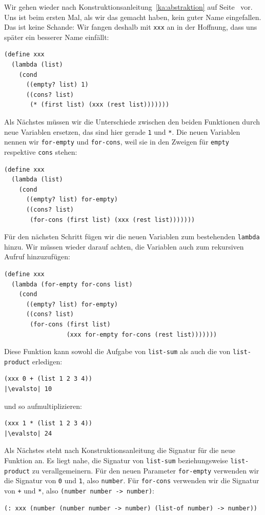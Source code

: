Wir gehen wieder nach Konstruktionsanleitung~\ref{ka:abstraktion} auf
Seite~\pageref{ka:abstraktion} vor.  Uns ist beim ersten Mal, als wir
das gemacht haben, kein guter Name eingefallen.  Das ist keine
Schande: Wir fangen deshalb mit \lstinline{xxx} an in der Hoffnung,
dass uns später ein besserer Name einfällt:
%
\begin{lstlisting}
(define xxx
  (lambda (list)
    (cond
      ((empty? list) 1)
      ((cons? list)
       (* (first list) (xxx (rest list)))))))
\end{lstlisting}
%
Als Nächstes müssen wir die Unterschiede zwischen den beiden
Funktionen durch neue Variablen ersetzen, das sind hier gerade
\lstinline{1} und \lstinline{*}.  Die neuen Variablen nennen wir
\lstinline{for-empty} und \lstinline{for-cons}, weil sie in den
Zweigen für \lstinline{empty} respektive \lstinline{cons} stehen:
%
\begin{lstlisting}
(define xxx
  (lambda (list)
    (cond
      ((empty? list) for-empty)
      ((cons? list)
       (for-cons (first list) (xxx (rest list)))))))
\end{lstlisting}
%
Für den nächsten Schritt fügen wir die neuen Variablen zum bestehenden
\lstinline{lambda} hinzu.  Wir müssen wieder darauf achten, die
Variablen auch zum rekursiven Aufruf hinzuzufügen:
%
\begin{lstlisting}
(define xxx
  (lambda (for-empty for-cons list)
    (cond
      ((empty? list) for-empty)
      ((cons? list)
       (for-cons (first list)
                 (xxx for-empty for-cons (rest list)))))))
\end{lstlisting}
%
Diese Funktion kann sowohl die Aufgabe von \lstinline{list-sum} als
auch die von \lstinline{list-product} erledigen:
%
\begin{lstlisting}
(xxx 0 + (list 1 2 3 4))
|\evalsto| 10
\end{lstlisting}
%
und so aufmultiplizieren:
%
\begin{lstlisting}
(xxx 1 * (list 1 2 3 4))
|\evalsto| 24
\end{lstlisting}
%
Als Nächstes steht nach Konstruktionsanleitung die Signatur für die
neue Funktion an.  Es liegt nahe, die Signatur von
\lstinline{list-sum} beziehungsweise \lstinline{list-product} zu
verallgemeinern.  Für den neuen Parameter \lstinline{for-empty}
verwenden wir die Signatur von \lstinline{0} und \lstinline{1}, also
\lstinline{number}.  Für \lstinline{for-cons} verwenden wir die
Signatur von \lstinline{+} und \lstinline{*}, also
\lstinline{(number number -> number)}:
%
\begin{lstlisting}
(: xxx (number (number number -> number) (list-of number) -> number))
\end{lstlisting}
